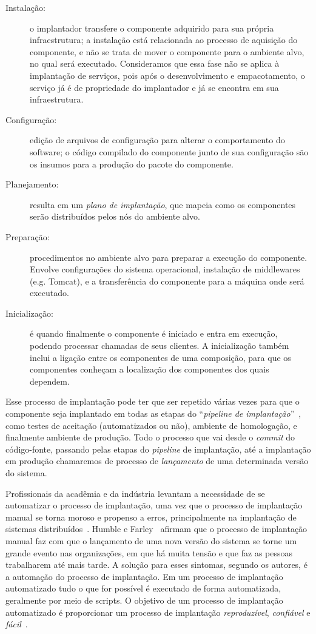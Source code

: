\begin{description}
\item [Instalação:] o implantador transfere o componente adquirido para sua própria infraestrutura; a instalação está relacionada ao processo de aquisição do componente, e não se trata de mover o componente para o ambiente alvo, no qual será executado. Consideramos que essa fase não se aplica à implantação de serviços, pois após o desenvolvimento e empacotamento, o serviço já é de propriedade do implantador e já se encontra em sua infraestrutura.
\item [Configuração:] edição de arquivos de configuração para alterar o comportamento do software; 
o código compilado do componente junto de sua configuração são os insumos para a produção do pacote do componente.
\item [Planejamento:] resulta em um \emph{plano de implantação}, que mapeia como os componentes serão distribuídos pelos nós do ambiente alvo.  
\item [Preparação:] procedimentos no ambiente alvo para preparar a execução do componente. Envolve configurações do sistema operacional, instalação de middlewares (e.g. Tomcat), e a transferência do componente para a máquina onde será executado. 
\item [Inicialização:] é quando finalmente o componente é iniciado e entra em execução, podendo processar chamadas de seus clientes. A inicialização também inclui a ligação entre os componentes de uma composição, para que os componentes conheçam a localização dos componentes dos quais dependem.
\end{description}

Esse processo de implantação pode ter que ser repetido várias vezes para que o componente
seja implantado em todas as etapas do ``\emph{pipeline de implantação}''~\cite{Humble2011Continuous},
como testes de aceitação (automatizados ou não), ambiente de homologação, e finalmente ambiente de produção. 
Todo o processo que vai desde o \emph{commit} do código-fonte,
passando pelas etapas do \emph{pipeline} de implantação, até a implantação em produção
chamaremos de processo de \emph{lançamento} de uma determinada versão do sistema.

Profissionais da acadêmia e da indústria levantam a necessidade de se automatizar o processo de implantação, uma vez que o processo de implantação manual se torna moroso e propenso a erros, principalmente na implantação de sistemas distribuídos~\cite{Humble2011Continuous,Dolstra2005Configuration}. 
Humble e Farley~\cite{Humble2011Continuous} afirmam que o processo de implantação manual faz com que  
o lançamento de uma nova versão do sistema se torne um grande evento nas organizações, 
em que há muita tensão e que faz as pessoas trabalharem até mais tarde.
A solução para esses sintomas, segundo os autores, é a automação do processo de implantação.
Em um processo de implantação automatizado tudo o que for possível é executado de forma automatizada,
geralmente por meio de scripts. O objetivo de um processo de implantação automatizado
é proporcionar um processo de implantação \emph{reproduzível}, \emph{confiável} e \emph{fácil}~\cite{Humble2011Continuous}.

